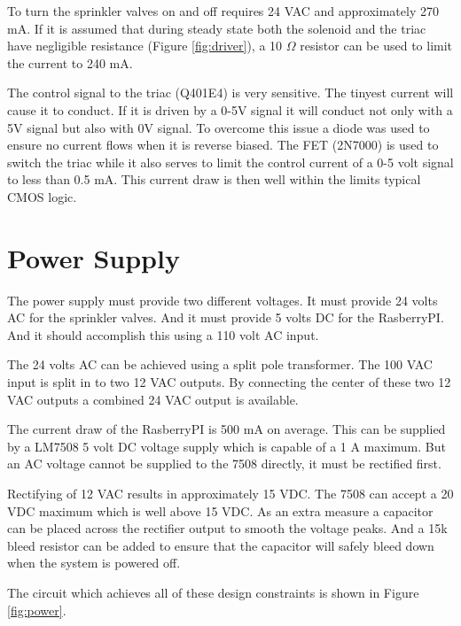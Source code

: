 \documentclass{article}
\begin{document}
To turn the sprinkler valves on and off requires 24 VAC
and approximately 270 mA.
If it is assumed that during steady state both the solenoid
and the triac have negligible resistance (Figure \ref{fig:driver}),
a 10 $\Omega$ resistor can be used to limit the current to 240 mA.

The control signal to the triac (Q401E4) is very sensitive.
The tinyest current will cause it to conduct.
If it is driven by a 0-5V signal it will conduct not only
with a 5V signal but also with 0V signal.
To overcome this issue a diode was used to ensure no current
flows when it is reverse biased.
The FET (2N7000) is used to switch the triac while it also
serves to limit the control current of a 0-5 volt signal
to less than 0.5 mA.
This current draw is then well within the limits typical CMOS logic.


\clearpage
\section{Power Supply}
\label{sec:power}

The power supply must provide two different voltages.
It must provide 24 volts AC for the sprinkler valves.
And it must provide 5 volts DC for the RasberryPI.
And it should accomplish this using a 110 volt AC
input.

The 24 volts AC can be achieved using a split pole
transformer.
The 100 VAC input is split in to two 12 VAC outputs.
By connecting the center of these two 12 VAC outputs
a combined 24 VAC output is available.

The current draw of the RasberryPI is 500 mA on average.
This can be supplied by a LM7508 5 volt DC voltage supply
which is capable of a 1 A maximum.
But an AC voltage cannot be supplied to the 7508 directly,
it must be rectified first.

Rectifying of 12 VAC results in approximately 15 VDC.
The 7508 can accept a 20 VDC maximum which is well above 15 VDC.
As an extra measure a capacitor can be placed across the
rectifier output to smooth the voltage peaks.
And a 15k bleed resistor can be added to ensure that the capacitor
will safely bleed down when the system is powered off.

The circuit which achieves all of these design constraints is
shown in Figure \ref{fig:power}.
\end{document}
